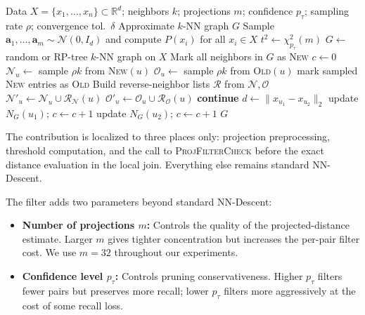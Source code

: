 \begin{algorithm}[t]
\caption{Projection-Filtered NN-Descent}
\label{alg:filtered_nndescent}
\begin{algorithmic}
\small
\Require Data $X = \{x_1, \ldots, x_n\} \subset \mathbb{R}^d$; neighbors $k$; projections $m$; confidence $p_\tau$; sampling rate $\rho$; convergence tol.\ $\delta$
\Ensure Approximate $k$-NN graph $G$
\State Sample $\mathbf{a}_1,\ldots,\mathbf{a}_m \sim \mathcal{N}(0, I_d)$ and compute $P(x_i)$ for all $x_i \in X$ 
\State $t^2 \gets \chi^2_{p_\tau}(m)$ 
\State $G \gets$ random or RP-tree $k$-NN graph on $X$
\State Mark all neighbors in $G$ as \textsc{New}
\Repeat {}
    \State $c \gets 0$
        \State $\mathcal{N}_u \gets$ sample $\rho k$ from \textsc{New}$(u)$
        \State $\mathcal{O}_u \gets$ sample $\rho k$ from \textsc{Old}$(u)$
        \State mark sampled \textsc{New} entries as \textsc{Old}
    \EndFor
    \State Build reverse-neighbor lists $\mathcal{R}$ from $\mathcal{N}, \mathcal{O}$
     
        \State $\mathcal{N}'_u \gets \mathcal{N}_u \cup \mathcal{R}_{\mathcal{N}}(u)$
        \State $\mathcal{O}'_u \gets \mathcal{O}_u \cup \mathcal{R}_{\mathcal{O}}(u)$
             
                \State \textbf{continue}
            \EndIf
            \State $d \gets \|x_{u_1} - x_{u_2}\|_2$
             update $N_G(u_1)$; $c \gets c+1$ \EndIf
             update $N_G(u_2)$; $c \gets c+1$ \EndIf
        \EndFor
    \EndFor
{}
\State \Return $G$
\end{algorithmic}
\end{algorithm}

The contribution is localized to three places only: projection preprocessing, threshold computation, and the call to \textsc{ProjFilterCheck} before the exact distance evaluation in the local join. Everything else remains standard NN-Descent.

The filter adds two parameters beyond standard NN-Descent:
\begin{itemize}
    \item \textbf{Number of projections $m$:} Controls the quality of the projected-distance estimate. Larger $m$ gives tighter concentration but increases the per-pair filter cost. We use $m = 32$ throughout our experiments.
    \item \textbf{Confidence level $p_\tau$:} Controls pruning conservativeness. Higher $p_\tau$ filters fewer pairs but preserves more recall; lower $p_\tau$ filters more aggressively at the cost of some recall loss.
\end{itemize}

